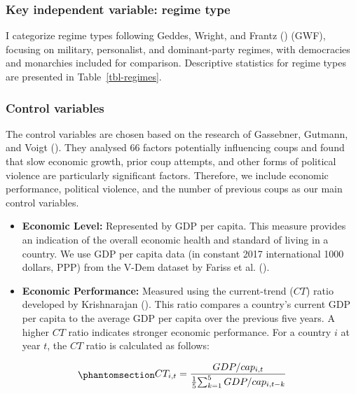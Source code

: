 \documentclass[
  12pt,
]{report}
\providecommand{\tightlist}{%
  \setlength{\itemsep}{0pt}\setlength{\parskip}{0pt}}\usepackage{longtable,booktabs,array}
\begin{document}
\subsubsection{Key independent variable: regime
type}\label{sec-chapter2322}

I categorize regime types following Geddes, Wright, and Frantz
() (GWF), focusing on military,
personalist, and dominant-party regimes, with democracies and monarchies
included for comparison. Descriptive statistics for regime types are
presented in Table~\ref{tbl-regimes}.

\subsubsection{Control variables}\label{control-variables}

The control variables are chosen based on the research of Gassebner,
Gutmann, and Voigt (). They analysed
66 factors potentially influencing coups and found that slow economic
growth, prior coup attempts, and other forms of political violence are
particularly significant factors. Therefore, we include economic
performance, political violence, and the number of previous coups as our
main control variables.

\begin{itemize}
\tightlist
\item
  \textbf{Economic Level:} Represented by GDP per capita. This measure
  provides an indication of the overall economic health and standard of
  living in a country. We use GDP per capita data (in constant 2017
  international 1000 dollars, PPP) from the V-Dem dataset by Fariss et
  al. ().
\item
  \textbf{Economic Performance:} Measured using the current-trend
  (\(CT\)) ratio developed by Krishnarajan
  (). This ratio compares a
  country's current GDP per capita to the average GDP per capita over
  the previous five years. A higher \(CT\) ratio indicates stronger
  economic performance. For a country \(i\) at year \(t\), the \(CT\)
  ratio is calculated as follows:
\end{itemize}

\begin{equation}\phantomsection\label{eq-eq6}{
    \begin{aligned}
    CT_{i,t} = {GDP/cap_{i,t} \over {1 \over 5} {\sum_{k=1}^5GDP/cap_{i,t-k}}}
    \end{aligned}
}\end{equation}
\end{document}
